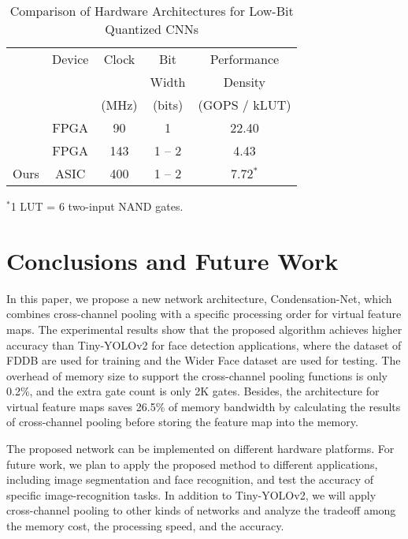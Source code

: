 \documentclass[10pt,twocolumn,letterpaper]{article}
\begin{document}
\begin{table}
\begin{center}
\begin{tabular}{l|cccc}
\hline
               & Device          &  Clock & Bit        & Performance \\
               &                 &        & Width      & Density\\
               &                 &  (MHz) & (bits)      & (GOPS / kLUT)\\
\hline\hline
~\cite{li17}   & FPGA           & 90    & 1               & 22.40\\
~\cite{zhao17} & FPGA           & 143   & 1 -- 2          & 4.43 \\
Ours           & ASIC           & 400   & 1 -- 2          & 7.72$^{*}$\\
\hline
\end{tabular}
\end{center}
{\small
$^{*}$1 LUT = 6 two-input NAND gates.\\
}
\caption{Comparison of Hardware Architectures for Low-Bit Quantized CNNs}
\label{tab:related}
\end{table}






\section{Conclusions and Future Work}
\label{sec:conclusion}

In this paper, we propose a new network architecture, Condensation-Net, which combines cross-channel pooling with a specific processing order for virtual feature maps. The experimental results show that the proposed algorithm achieves higher accuracy than Tiny-YOLOv2 for face detection applications, where the dataset of FDDB are used for training and the Wider Face dataset are used for testing. The overhead of memory size to support the cross-channel pooling functions is only 0.2\%, and the extra gate count is only 2K gates. Besides, the architecture for virtual feature maps saves 26.5\% of memory bandwidth by calculating the results of cross-channel pooling before storing the feature map into the memory.

The proposed network can be implemented on different hardware platforms. For future work, we plan to apply the proposed method to different applications, including image segmentation and face recognition, and test the accuracy of specific image-recognition tasks. In addition to Tiny-YOLOv2, we will apply cross-channel pooling to other kinds of networks and analyze the tradeoff among the memory cost, the processing speed, and the accuracy.

{\small


}
\end{document}
